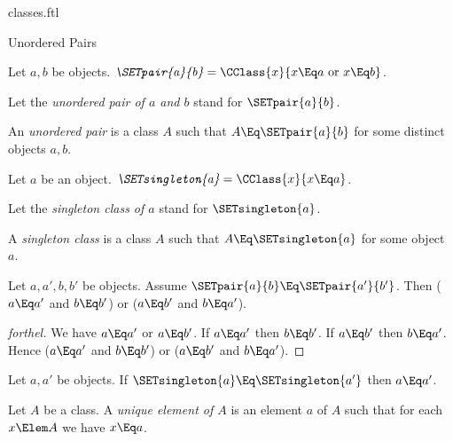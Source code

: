 \documentclass{stex}
\begin{document}
\begin{smodule}{classes.ftl}
\begin{sfragment}{Unordered Pairs}
  \begin{definition}[forthel,id=FOUNDATIONS_01_3471035364016128]
    Let $a, b$ be objects.
    $\emph{\SETpair{a}{b}} = \CClass{x}{x \Eq a\text{ or }x \Eq b}$.

    Let the \emph{unordered pair of $a$ and $b$} stand for $\SETpair{a}{b}$.
  \end{definition}

  \begin{definition}[forthel,id=FOUNDATIONS_01_605432672419840]
    An \emph{unordered pair} is a class $A$ such that $A \Eq \SETpair{a}{b}$ for some distinct objects $a, b$.
  \end{definition}

  \begin{definition}[forthel,id=FOUNDATIONS_01_1160414603771904]
    Let $a$ be an object.
    $\emph{\SETsingleton{a}} = \CClass{x}{x \Eq a}$.

    Let the \emph{singleton class of $a$} stand for $\SETsingleton{a}$.
  \end{definition}

  \begin{definition}[forthel,id=FOUNDATIONS_01_6786618161627136]
    A \emph{singleton class} is a class $A$ such that $A \Eq \SETsingleton{a}$ for some object $a$.
  \end{definition}

  \begin{proposition}[forthel,id=FOUNDATIONS_01_6125259604361216]
    Let $a, a', b, b'$ be objects.
    Assume $\SETpair{a}{b} \Eq \SETpair{a'}{b'}$.
    Then ($a \Eq a'$ and $b \Eq b'$) or ($a \Eq b'$ and $b \Eq a'$).
  \end{proposition}
  \begin{proof}[forthel]
    We have $a \Eq a'$ or $a \Eq b'$.
    If $a \Eq a'$ then $b \Eq b'$.
    If $a \Eq b'$ then $b \Eq a'$.
    Hence ($a \Eq a'$ and $b \Eq b'$) or ($a \Eq b'$ and $b \Eq a'$).
  \end{proof}

  \begin{corollary}[forthel,id=FOUNDATIONS_01_6954678910713856]
    Let $a, a'$ be objects.
    If $\SETsingleton{a} \Eq \SETsingleton{a'}$ then $a \Eq a'$.
  \end{corollary}

  \begin{definition}[forthel,id=FOUNDATIONS_01_29867480293464351]
    Let $A$ be a class.
    A \emph{unique element of $A$} is an element $a$ of $A$ such that for each $x \Elem A$ we have $x \Eq a$.
  \end{definition}


\end{sfragment}
\end{smodule}
\end{document}
